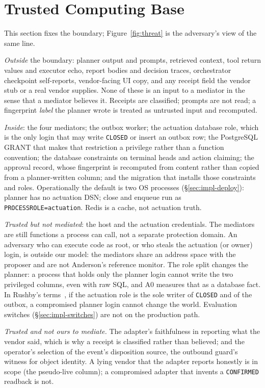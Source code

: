 \documentclass[acmsmall,manuscript,review,anonymous]{acmart}
\renewcommand{\_}{\discretionary{\textunderscore}{}{\textunderscore}}
\begin{document}
\section{Trusted Computing Base}
\label{sec:tcb}

This section fixes the boundary; Figure~\ref{fig:threat} is the
adversary's view of the same line.

\emph{Outside} the boundary: planner output and prompts, retrieved context,
tool return values and executor echo, report bodies and decision traces,
orchestrator checkpoint self-reports, vendor-facing UI copy, and any receipt
field the vendor stub or a real vendor supplies. None of these is an input to a
mediator in the sense that a mediator believes it. Receipts are classified;
prompts are not read; a fingerprint \emph{label} the planner wrote is treated as
untrusted input and recomputed.

\emph{Inside}: the four mediators; the outbox worker; the actuation database
role, which is the only login that may write \texttt{CLOSED} or insert an
outbox row; the {PostgreSQL} {GRANT} that makes that restriction a privilege
rather than a function convention; the database constraints on terminal heads
and action claiming; the approval record, whose fingerprint is recomputed from
content rather than copied from a planner-written column; and the migration that
installs those constraints and roles. Operationally the default is two {OS} processes
(\S\ref{sec:impl-deploy}): planner has no actuation {DSN}; close and
enqueue run as \texttt{PROCESS\_ROLE=actuation}. Redis is a cache, not
actuation truth.

\emph{Trusted but not mediated}: the host and the actuation credentials. The
mediators are still functions a process can call, not a separate protection
domain. An adversary who can execute code as root, or who steals the actuation
(or owner) login, is outside our model: the mediators share an address
space with the proposer and are not Anderson's reference
monitor. The role split changes the planner: a process that
holds only the planner login cannot write the two privileged columns,
even with raw {SQL}, and A0 measures that as a database fact.
In Rushby's terms~\cite{rushby1981design}, if the actuation role is the sole writer
of \texttt{CLOSED} and of the outbox, a compromised planner login cannot
change the world. Evaluation switches
(\S\ref{sec:impl-switches}) are not on the production path.

\emph{Trusted and not ours to mediate.} The adapter's faithfulness in reporting
what the vendor said, which is why a receipt is classified rather than believed;
and the operator's selection of the event's disposition source, the outbound
guard's witness for object identity. A lying vendor that the
adapter reports honestly is in scope (the pseudo-live column); a compromised
adapter that invents a \texttt{CONFIRMED} readback is not.
\end{document}
